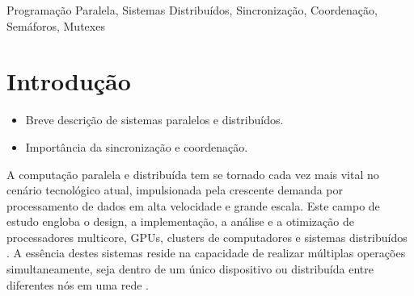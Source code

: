 \documentclass[conference]{IEEEtran}
\begin{document}
\begin{IEEEkeywords}
    Programação Paralela, Sistemas Distribuídos, Sincronização, Coordenação, Semáforos, Mutexes
\end{IEEEkeywords}















\section{Introdução}
\begin{itemize}
    \item Breve descrição de sistemas paralelos e distribuídos.
    \item Importância da sincronização e coordenação.
\end{itemize}

A computação paralela e distribuída tem se tornado cada vez mais vital 
no cenário tecnológico atual, impulsionada pela crescente demanda 
por processamento de dados em alta velocidade e grande escala. 
Este campo de estudo engloba o design, a implementação, 
a análise e a otimização de processadores multicore, GPUs, 
clusters de computadores 
e sistemas distribuídos \cite{coulouris2011distributed}. 
A essência destes sistemas reside na capacidade de realizar múltiplas 
operações simultaneamente, seja dentro de um único dispositivo ou 
distribuída entre diferentes nós em uma rede \cite{tanenbaum2007distributed}.
\end{document}
